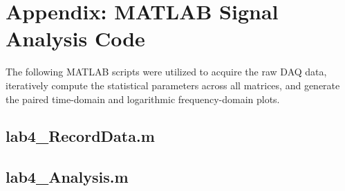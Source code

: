 \documentclass[11pt]{article}
\begin{document}
\newpage
\appendix
\section*{Appendix: MATLAB Signal Analysis Code}
The following MATLAB scripts were utilized to acquire the raw DAQ data, iteratively compute the statistical parameters across all matrices, and generate the paired time-domain and logarithmic frequency-domain plots.

\subsection*{lab4\_RecordData.m}


\subsection*{lab4\_Analysis.m}

\end{document}
